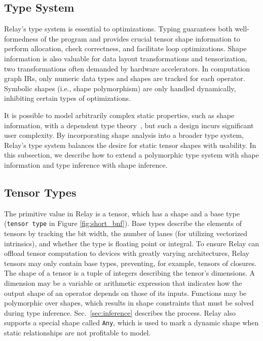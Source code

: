 \subsection{Type System}
  \label{subsec:type_system}

  Relay's type system is essential
    to optimizations.
  Typing guarantees both well-formedness of the program
    and provides crucial tensor shape information to perform allocation,
    check correctness, and facilitate loop optimizations.
  Shape information is also valuable for data layout transformations and tensorization,
    two transformations often demanded by hardware accelerators.
  In computation graph IRs, only numeric data types
    and shapes are tracked for each operator.
  Symbolic shapes (i.e., shape polymorphism) are only handled
    dynamically, inhibiting certain types of optimizations.

  It is possible to model arbitrarily complex static properties, such
    as shape information, with a dependent type theory~\citep{selsam_certigrad}, but such
    a design incurs significant user complexity.
  By incorporating shape analysis into a broader type system,
    Relay's type system balances the desire for static tensor shapes
    with usability.
  In this subsection, we describe how to extend a polymorphic type system with shape
    information and type inference with shape inference.

  \subsection*{Tensor Types}

  The primitive value in Relay is a tensor, which has
    a shape and a base type (\verb|tensor type| in Figure \ref{fig:short_bnf}).
  Base types describe the elements of tensors by tracking
    the bit width,
    the number of lanes (for utilizing vectorized intrinsics),
    and whether the type is floating point or integral.
  To ensure Relay can offload tensor computation to devices
    with greatly varying architectures,
    Relay tensors may only contain base types,
    preventing, for example, tensors of closures.
  The shape of a tensor is a tuple of integers describing the tensor's dimensions.
  A dimension may be a variable or arithmetic expression that indicates how the
    output shape of an operator depends on those of its inputs.
  Functions may be polymorphic over shapes, which results
    in shape constraints that must be solved during type inference.
  Sec.~\ref{sec:inference} describes the process.
  Relay also supports a special shape called \verb|Any|, which is used
    to mark a dynamic shape when static relationships are not profitable
    to model.

